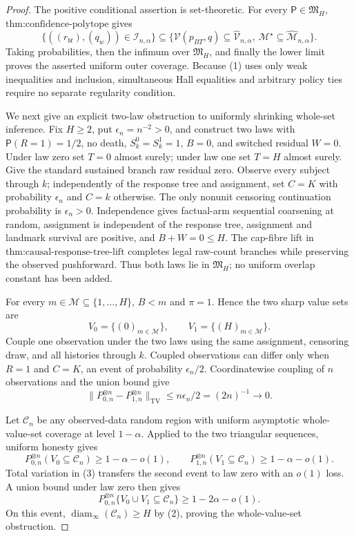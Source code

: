 \documentclass{article}
\begin{document}
\begin{proof}
The positive conditional assertion is set-theoretic.  For every \(\mathsf P\in\mathfrak M_H\), \(\text{thm:confidence-polytope}\) gives
\[
 \{((r_{bt}),(q_w))\in\mathcal I_{n,\alpha}\}
 \subseteq
 \{\mathcal V(p_{BT},q)\subseteq\widehat{\mathcal V}_{n,\alpha},\ 
   \mathcal M^\star\subseteq\widehat{\mathcal M}_{n,\alpha}\}.       \tag{1}
\]
Taking probabilities, then the infimum over \(\mathfrak M_H\), and finally the lower limit proves the asserted uniform outer coverage.  Because (1) uses only weak inequalities and inclusion, simultaneous Hall equalities and arbitrary policy ties require no separate regularity condition.

We next give an explicit two-law obstruction to uniformly shrinking whole-set inference.  Fix \(H\ge2\), put \(\epsilon_n=n^{-2}>0\), and construct two laws with \(\mathsf P(R=1)=1/2\), no death, \(S_k^0=S_k^1=1\), \(B=0\), and switched residual \(W=0\).  Under law zero set \(T=0\) almost surely; under law one set \(T=H\) almost surely.  Give the standard sustained branch raw residual zero.  Observe every subject through \(k\); independently of the response tree and assignment, set \(C=K\) with probability \(\epsilon_n\) and \(C=k\) otherwise.  The only nonunit censoring continuation probability is \(\epsilon_n>0\).  Independence gives factual-arm sequential coarsening at random, assignment is independent of the response tree, assignment and landmark survival are positive, and \(B+W=0\le H\).  The cap-fibre lift in \(\text{thm:causal-response-tree-lift}\) completes legal raw-count branches while preserving the observed pushforward.  Thus both laws lie in \(\mathfrak M_H\); no uniform overlap constant has been added.

For every \(m\in\mathcal M\subseteq\{1,\ldots,H\}\), \(B<m\) and \(\pi=1\).  Hence the two sharp value sets are
\[
 V_0=\{(0)_{m\in\mathcal M}\},\qquad
 V_1=\{(H)_{m\in\mathcal M}\}.                           \tag{2}
\]
Couple one observation under the two laws using the same assignment, censoring draw, and all histories through \(k\).  Coupled observations can differ only when \(R=1\) and \(C=K\), an event of probability \(\epsilon_n/2\).  Coordinatewise coupling of \(n\) observations and the union bound give
\[
 \lVert P_{0,n}^{\otimes n}-P_{1,n}^{\otimes n}\rVert_{\mathrm{TV}}
 \le n\epsilon_n/2=(2n)^{-1}\longrightarrow0.             \tag{3}
\]

Let \(\mathcal C_n\) be any observed-data random region with uniform asymptotic whole-value-set coverage at level \(1-\alpha\).  Applied to the two triangular sequences, uniform honesty gives
\[
 P_{0,n}^{\otimes n}(V_0\subseteq\mathcal C_n)\ge1-\alpha-o(1),\qquad
 P_{1,n}^{\otimes n}(V_1\subseteq\mathcal C_n)\ge1-\alpha-o(1).        \tag{4}
\]
Total variation in (3) transfers the second event to law zero with an \(o(1)\) loss.  A union bound under law zero then gives
\[
 P_{0,n}^{\otimes n}\{V_0\cup V_1\subseteq\mathcal C_n\}
 \ge1-2\alpha-o(1).                                      \tag{5}
\]
On this event, \(\operatorname{diam}_{\infty}(\mathcal C_n)\ge H\) by (2), proving the whole-value-set obstruction.


\end{proof}
\end{document}
